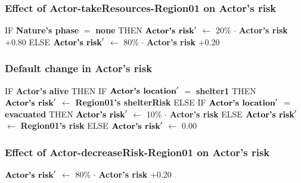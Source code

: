 \documentclass{article}%
\begin{document}
%
\subsubsection{Effect of Actor{-}takeResources{-}Region01 on Actor's risk}%
\label{ssubsec:Effect of Actor{-}takeResources{-}Region01 on Actor's risk}%
\begin{flushleft}%
IF %
\textbf{Nature's phase}%
$=$%
\textbf{none}%
\linebreak%
\hspace*{2em}%
THEN %
$\mbox{\textbf{Actor's risk}} '$%
$\leftarrow$%
20\%%
$\cdot$%
\textbf{Actor's risk}%
+0.80%
\linebreak%
\hspace*{2em}%
ELSE %
$\mbox{\textbf{Actor's risk}} '$%
$\leftarrow$%
80\%%
$\cdot$%
\textbf{Actor's risk}%
+0.20%
\end{flushleft}

%
\subsubsection{Default change in Actor's risk}%
\label{ssubsec:Default change in Actor's risk}%
\begin{flushleft}%
IF %
\textbf{Actor's alive}%
\linebreak%
\hspace*{2em}%
THEN %
IF %
$\mbox{\textbf{Actor's location}} '$%
$=$%
\textbf{shelter1}%
\linebreak%
\hspace*{4em}%
THEN %
$\mbox{\textbf{Actor's risk}} '$%
$\leftarrow$%
\textbf{Region01's shelterRisk}%
\linebreak%
\hspace*{4em}%
ELSE %
IF %
$\mbox{\textbf{Actor's location}} '$%
$=$%
\textbf{evacuated}%
\linebreak%
\hspace*{6em}%
THEN %
$\mbox{\textbf{Actor's risk}} '$%
$\leftarrow$%
10\%%
$\cdot$%
\textbf{Actor's risk}%
\linebreak%
\hspace*{6em}%
ELSE %
$\mbox{\textbf{Actor's risk}} '$%
$\leftarrow$%
\textbf{Region01's risk}%
\linebreak%
\hspace*{2em}%
ELSE %
$\mbox{\textbf{Actor's risk}} '$%
$\leftarrow$%
0.00%
\end{flushleft}

%
\subsubsection{Effect of Actor{-}decreaseRisk{-}Region01 on Actor's risk}%
\label{ssubsec:Effect of Actor{-}decreaseRisk{-}Region01 on Actor's risk}%
\begin{flushleft}%
$\mbox{\textbf{Actor's risk}} '$%
$\leftarrow$%
80\%%
$\cdot$%
\textbf{Actor's risk}%
+0.20%
\end{flushleft}
\end{document}
